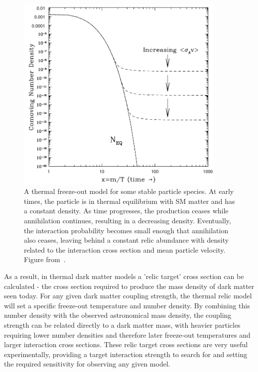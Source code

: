 \begin{figure}
	\centering
	\includegraphics[width=0.9\textwidth]{figures/thermal_relic.png}
	\caption[Thermal Freeze-Out]{A thermal freeze-out model for some stable particle species. At early times, the particle is in thermal equilibrium with SM matter and has a constant density. As time progresses, the production ceases while annihilation continues, resulting in a decreasing density. Eventually, the interaction probability becomes small enough that annihilation also ceases, leaving behind a constant relic abundance with density related to the interaction cross section and mean particle velocity. Figure from~\cite{hooper2009tasi}.}
        \label{fig:freezeout}
\end{figure}

As a result, in thermal dark matter models a 'relic target' cross section can be calculated - the cross section required to produce the mass density of dark matter seen today.
For any given dark matter coupling strength, the thermal relic model will set a specific freeze-out temperature and number density.
By combining this number density with the observed astronomical mass density, the coupling strength can be related directly to a dark matter mass, with heavier particles requiring lower number densities and therefore later freeze-out temperatures and larger interaction cross sections.
These relic target cross sections are very useful experimentally, providing a target interaction strength to search for and setting the required sensitivity for observing any given model.


